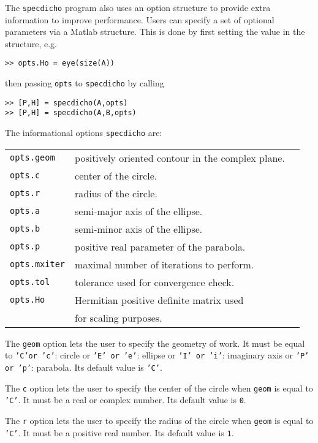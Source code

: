 \documentclass[acmtocl]{acmtrans2m}
\begin{document}
The {\tt specdicho} program also uses an option structure to provide extra information to improve performance.
Users can specify a set of optional parameters via a {\sc Matlab} structure.
This is done by first setting the value in the structure, e.g.
\begin{verbatim}
>> opts.Ho = eye(size(A))
\end{verbatim}
then passing {\tt  opts} to {\tt specdicho} by calling
\begin{verbatim}
>> [P,H] = specdicho(A,opts)
>> [P,H] = specdicho(A,B,opts)
\end{verbatim}

The informational options {\tt specdicho} are:
\begin{center}
\begin{tabular}{lll}
{\tt  opts.geom}  & positively oriented contour in the complex plane.\\
{\tt  opts.c}     & center of the circle.\\
{\tt  opts.r}     & radius of the circle.\\
{\tt  opts.a}     & semi-major axis of the ellipse.\\
{\tt  opts.b}     & semi-minor axis of the ellipse.\\
{\tt  opts.p}     & positive real parameter of the parabola.\\
{\tt  opts.mxiter}& maximal number of iterations to perform.\\
{\tt  opts.tol}   & tolerance used for convergence check.\\
{\tt opts.Ho}     & Hermitian positive definite matrix used\\
                  & for scaling purposes.\\
\end{tabular}
\end{center}

The {\tt  geom} option lets the user to specify the geometry of work.
It must be equal to {\tt 'C'or 'c'}: circle or {\tt  'E' or 'e'}: ellipse or {\tt  'I' or 'i'}: imaginary axis or {\tt  'P' or 'p'}: parabola.
Its default value is {\tt 'C'}.

The {\tt  c} option lets the user to specify the center of the circle when {\tt geom} is equal to {\tt 'C'}. It must be a real or complex number.
Its default value is {\tt 0}.

The {\tt  r} option lets the user to specify the radius of the circle when {\tt geom} is equal to {\tt 'C'}.
It must be a positive real number.
Its default value is {\tt 1}.
\end{document}
